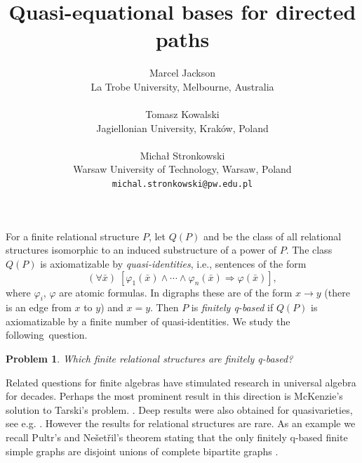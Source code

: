\documentclass[a4paper]{article} %
\date{} %
\newtheorem{problem}[theorem]{Problem}
\begin{document}
\setcounter{page}{1} %

\title{Quasi-equational bases for directed paths}

\author{Marcel Jackson \\ %
       La Trobe University, Melbourne, Australia\\ \\ %
       Tomasz Kowalski \\ %
       Jagiellonian University, Krak\'ow,
   Poland\\ \\ %
        Michał Stronkowski \\
        Warsaw University of Technology,
   Warsaw, Poland \\
       \texttt{michal.stronkowski@pw.edu.pl} %
       }%

\maketitle


For a finite relational structure $P$, let $Q(P)$ and  be the class of 
all relational structures isomorphic to an induced  
 substructure of a power of
$P$.  The class $Q(P)$ is axiomatizable by \emph{quasi-identities}, i.e., sentences of the form  
\[
(\forall \bar x)\; [\varphi_1(\bar x)\land\cdots\land\varphi_n(\bar
x)\Rightarrow \varphi(\bar x)],  
\]
where $\varphi_i$, $\varphi$ are atomic formulas. In digraphs these are of the
form $x\to y$ (there is an edge from $x$ to $y$) and $x=y$.   
Then $P$ is \emph{finitely q-based}  if
$Q(P)$ is axiomatizable by a finite number of 
quasi-identities. We study the \mbox{following question.}

\begin{problem}
Which finite relational structures are finitely q-based?
\end{problem}

Related questions for finite algebras have stimulated research in universal algebra for decades. Perhaps the most prominent result in this direction is McKenzie's solution to Tarski's problem.%
\cite{McK96}. Deep results were also obtained for quasivarieties, see e.g. \cite{Dzi09,Pig88}.
However the results for
relational structures are rare. As an example we recall Pultr's and Ne\v set\v
ril's theorem stating that the only finitely q-based finite simple graphs are disjoint
unions of complete bipartite graphs \cite{Cai95}.  
\end{document}

